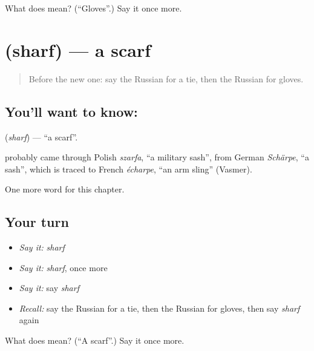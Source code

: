 \begin{tcolorbox}[breakable,colback=teal!4,colframe=teal!35!black,title={Before you move on}]
What does  mean? (\textquotedblleft{}Gloves\textquotedblright{}.) Say it once more.
\end{tcolorbox}
\section[\texorpdfstring{\ru{шарф} (sharf)}{шарф (sharf)}]{ (sharf) — a scarf}

\label{lesson:RU-C101-scarf}



\begin{quote}
Before the new one: say the Russian for a tie, then the Russian for gloves.
\end{quote}

\subsection*{You'll want to know: }
\textbf{} (\emph{sharf}) — \textquotedblleft{}a scarf\textquotedblright{}.

\begin{cousinweb}
\textbf{} probably came through Polish \emph{szarfa}, \textquotedblleft{}a military sash\textquotedblright{}, from German \emph{Schärpe}, \textquotedblleft{}a sash\textquotedblright{}, which is traced to French \emph{écharpe}, \textquotedblleft{}an arm sling\textquotedblright{} (Vasmer).
\end{cousinweb}

\begin{grammarlens}[title={What you've built}]
One more word for this chapter.
\end{grammarlens}

\subsection*{Your turn}
\begin{itemize}
\raggedright
  \item \emph{Say it:} \emph{sharf}
  \item \emph{Say it:} \emph{sharf}, once more
  \item \emph{Say it:} say \emph{sharf}
  \item \emph{Recall:} say the Russian for a tie, then the Russian for gloves, then say \emph{sharf} again
\end{itemize}

\begin{tcolorbox}[breakable,colback=teal!4,colframe=teal!35!black,title={Before you move on}]
What does  mean? (\textquotedblleft{}A scarf\textquotedblright{}.) Say it once more.
\end{tcolorbox}
